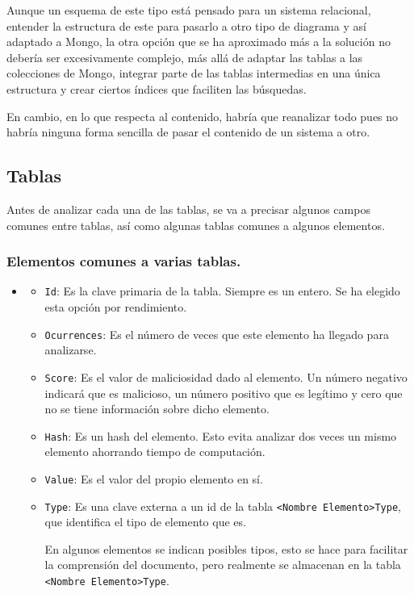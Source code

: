 Aunque un esquema de este tipo está pensado para un sistema relacional, entender la estructura de este para pasarlo a otro tipo de diagrama y así adaptado a Mongo, la otra opción que se ha aproximado más a la solución no debería ser excesivamente complejo, más allá de adaptar las tablas a las colecciones de Mongo, integrar parte de las tablas intermedias en una única estructura y crear ciertos índices que faciliten las búsquedas.

En cambio, en lo que respecta al contenido, habría que reanalizar todo pues no habría ninguna forma sencilla de pasar el contenido de un sistema a otro. 

\subsection{Tablas}
Antes de analizar cada una de las tablas, se va a precisar algunos campos comunes entre tablas, así como algunas tablas comunes a algunos elementos. 
\subsubsection{Elementos comunes a varias tablas.}
\begin{itemize}
    \item[] 
    \begin{itemize}
        \item \texttt{Id}: Es la clave primaria de la tabla. Siempre es un entero. Se ha elegido esta opción por rendimiento. 
        \item \texttt{Ocurrences}: Es el número de veces que este elemento ha llegado para analizarse.
        \item \texttt{Score}: Es el valor de maliciosidad dado al elemento. Un número negativo indicará que es malicioso, un número positivo que es legítimo y cero que no se tiene información sobre dicho elemento. 
        \item \texttt{Hash}: Es un hash del elemento. Esto evita analizar dos veces un mismo elemento ahorrando tiempo de computación.  
        \item \texttt{Value}: Es el valor del propio elemento en sí.
        \item \texttt{Type}: Es una clave externa a un id de la tabla \verb!<Nombre Elemento>Type!, que identifica el tipo de elemento que es. 
        
        En algunos elementos se indican posibles tipos, esto se hace para facilitar la comprensión del documento, pero realmente se almacenan en la tabla \verb!<Nombre Elemento>Type!.
    \end{itemize}
\end{itemize}

